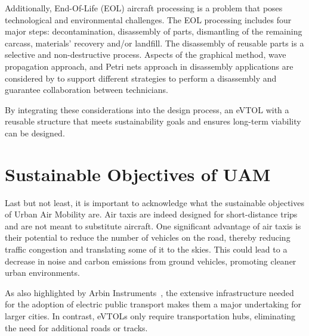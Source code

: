 Additionally, End-Of-Life (EOL) aircraft processing is a problem that poses technological and environmental challenges.
The EOL processing includes four major steps: decontamination, disassembly of parts, dismantling of the remaining carcass, materials’ recovery and/or landfill.
The disassembly of reusable parts is a selective and non-destructive process.
Aspects of the graphical method, wave propagation approach, and Petri nets approach in disassembly applications are considered by \textcite{camelot2013decision} to support different strategies to perform a disassembly and guarantee collaboration between technicians.

By integrating these considerations into the design process, an eVTOL with a reusable structure that meets sustainability goals and ensures long-term viability can be designed.

\section{Sustainable Objectives of UAM}
Last but not least, it is important to acknowledge what the sustainable objectives of Urban Air Mobility are.
Air taxis are indeed designed for short-distance trips and are not meant to substitute aircraft.
One significant advantage of air taxis is their potential to reduce the number of vehicles on the road, thereby reducing traffic congestion and translating some of it to the skies.
This could lead to a decrease in noise and carbon emissions from ground vehicles, promoting cleaner urban environments.

As also highlighted by Arbin Instruments~\cite{UAMSust}, the extensive infrastructure needed for the adoption of electric public transport makes them a major undertaking for larger cities.
 In contrast, eVTOLs only require transportation hubs, eliminating the need for additional roads or tracks.



